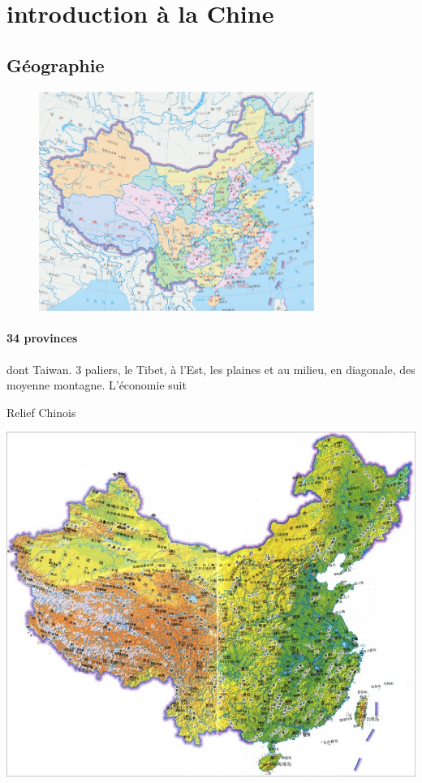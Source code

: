 \section{introduction à la Chine}


\subsection{Géographie}
\begin{figure}[!h]
    \centering
\includegraphics[width=0.8\textwidth]{ConfucianismeTaoismeBouddhismeChinois/Images/CarteChine.png}

    \label{fig:enter-label}
\end{figure}
\paragraph{34 provinces} dont Taiwan. 3 paliers, le Tibet, à l'Est, les plaines et au milieu, en diagonale, des moyenne montagne. L'économie suit
\begin{marginfigure} 
    \centering
        \caption{Relief Chinois}
\includegraphics[width=\textwidth]{ConfucianismeTaoismeBouddhismeChinois/Images/CarteChineRelief.jpg}

    \label{fig:enter-label}
\end{marginfigure}


